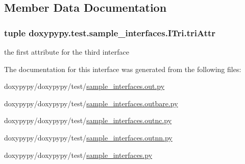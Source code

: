 \subsection{Member Data Documentation}
\hypertarget{classdoxypypy_1_1test_1_1sample__interfaces_1_1_i_tri_a1d73109f6b3b33857101f20963cc754b}{
\subsubsection[{tri\-Attr}]{\setlength{\rightskip}{0pt plus 5cm}tuple doxypypy.\-test.\-sample\-\_\-interfaces.\-I\-Tri.\-tri\-Attr\hspace{0.3cm}{\ttfamily [static]}}}\label{classdoxypypy_1_1test_1_1sample__interfaces_1_1_i_tri_a1d73109f6b3b33857101f20963cc754b}


the first attribute for the third interface 



The documentation for this interface was generated from the following files\-:\begin{DoxyCompactItemize}
\item 
doxypypy/doxypypy/test/\hyperlink{sample__interfaces_8out_8py}{sample\-\_\-interfaces.\-out.\-py}\item 
doxypypy/doxypypy/test/\hyperlink{sample__interfaces_8outbare_8py}{sample\-\_\-interfaces.\-outbare.\-py}\item 
doxypypy/doxypypy/test/\hyperlink{sample__interfaces_8outnc_8py}{sample\-\_\-interfaces.\-outnc.\-py}\item 
doxypypy/doxypypy/test/\hyperlink{sample__interfaces_8outnn_8py}{sample\-\_\-interfaces.\-outnn.\-py}\item 
doxypypy/doxypypy/test/\hyperlink{sample__interfaces_8py}{sample\-\_\-interfaces.\-py}\end{DoxyCompactItemize}
